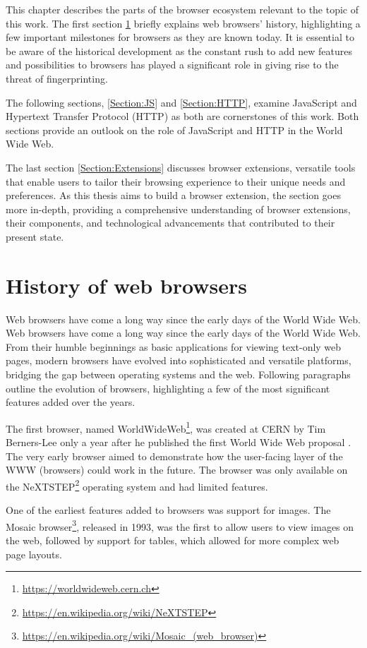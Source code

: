 This chapter describes the parts of the browser ecosystem relevant to the topic of this work. The first section \ref{Section:BrowsersHistory} briefly explains web browsers' history, highlighting a few important milestones for browsers as they are known today. It is essential to be aware of the historical development as the constant rush to add new features and possibilities to browsers has played a significant role in giving rise to the threat of fingerprinting.

The following sections, \ref{Section:JS} and \ref{Section:HTTP}, examine JavaScript and Hypertext Transfer Protocol (HTTP) as both are cornerstones of this work. Both sections provide an outlook on the role of JavaScript and HTTP in the World Wide Web.

The last section \ref{Section:Extensions} discusses browser extensions, versatile tools that enable users to tailor their browsing experience to their unique needs and preferences. As this thesis aims to build a browser extension, the section goes more in-depth, providing a comprehensive understanding of browser extensions, their components, and technological advancements that contributed to their present state.

\section{History of web browsers}
\label{Section:BrowsersHistory}

Web browsers have come a long way since the early days of the World Wide Web. Web browsers have come a long way since the early days of the World Wide Web. From their humble beginnings as basic applications for viewing text-only web pages, modern browsers have evolved into sophisticated and versatile platforms, bridging the gap between operating systems and the web. Following paragraphs outline the evolution of browsers, highlighting a few of the most significant features added over the years.

The first browser, named WorldWideWeb\footnote{\url{https://worldwideweb.cern.ch}}, was created at CERN by Tim Berners-Lee only a year after he published the first World Wide Web proposal \cite{WWWProposal}. The very early browser aimed to demonstrate how the user-facing layer of the WWW (browsers) could work in the future. The browser was only available on the NeXTSTEP\footnote{\url{https://en.wikipedia.org/wiki/NeXTSTEP}} operating system and had limited features.

One of the earliest features added to browsers was support for images. The Mosaic browser\footnote{\url{https://en.wikipedia.org/wiki/Mosaic_(web_browser)}}, released in 1993, was the first to allow users to view images on the web, followed by support for tables, which allowed for more complex web page layouts.

